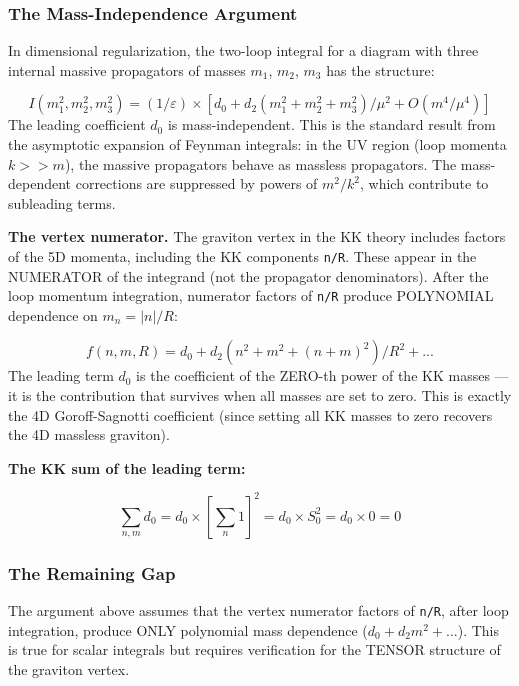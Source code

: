 \documentclass[aps,prd,preprint,superscriptaddress,longbibliography,floatfix]{revtex4-2}
\theoremstyle{remark}
\begin{document}
\subsubsection{The Mass-Independence Argument}

In dimensional regularization, the two-loop integral for a diagram with three internal massive propagators of masses $m_{1}$, $m_{2}$, $m_{3}$ has the structure:


\begin{equation}
    I(m_{1}^{2}, m_{2}^{2}, m_{3}^{2}) = (1/\varepsilon) \times [d_{0} + d_{2}(m_{1}^{2} + m_{2}^{2} + m_{3}^{2})/\mu^{2} + O(m^{4}/\mu^{4})]
\end{equation}
The leading coefficient $d_{0}$ is mass-independent. This is the standard result from the asymptotic expansion of Feynman integrals: in the UV region (loop momenta $k >> m$), the massive propagators behave as massless propagators. The mass-dependent corrections are suppressed by powers of $m^{2}/k^{2}$, which contribute to subleading terms.

\textbf{The vertex numerator.} The graviton vertex in the KK theory includes factors of the 5D momenta, including the KK components \texttt{n/R}. These appear in the NUMERATOR of the integrand (not the propagator denominators). After the loop momentum integration, numerator factors of \texttt{n/R} produce POLYNOMIAL dependence on $m_n = |n|/R$:


\begin{equation}
    f(n, m, R) = d_{0} + d_{2}(n^{2} + m^{2} + (n+m)^{2})/R^{2} + ...
\end{equation}
The leading term $d_{0}$ is the coefficient of the ZERO-th power of the KK masses --- it is the contribution that survives when all masses are set to zero. This is exactly the 4D Goroff-Sagnotti coefficient (since setting all KK masses to zero recovers the 4D massless graviton).

\textbf{The KK sum of the leading term:}


\begin{equation}
    \sum_{n,m} d_{0} = d_{0} \times [\sum_n 1]^{2} = d_{0} \times S_{0}^{2} = d_{0} \times 0 = 0
\end{equation}

\subsubsection{The Remaining Gap}

The argument above assumes that the vertex numerator factors of \texttt{n/R}, after loop integration, produce ONLY polynomial mass dependence ($d_{0} + d_{2}m^{2} + ...$). This is true for scalar integrals but requires verification for the TENSOR structure of the graviton vertex.
\end{document}
